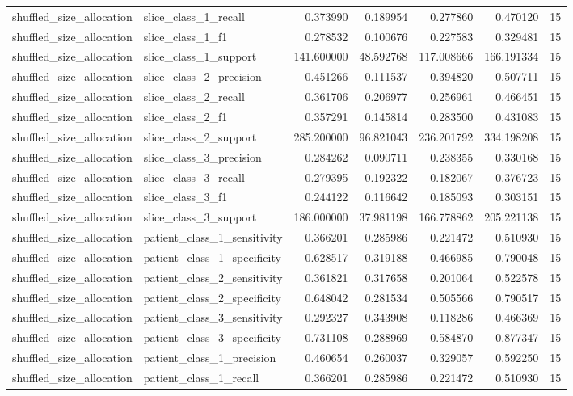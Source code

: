 \begin{tabular}{llrrrrr}
shuffled_size_allocation & slice_class_1_recall & 0.373990 & 0.189954 & 0.277860 & 0.470120 & 15 \\
shuffled_size_allocation & slice_class_1_f1 & 0.278532 & 0.100676 & 0.227583 & 0.329481 & 15 \\
shuffled_size_allocation & slice_class_1_support & 141.600000 & 48.592768 & 117.008666 & 166.191334 & 15 \\
shuffled_size_allocation & slice_class_2_precision & 0.451266 & 0.111537 & 0.394820 & 0.507711 & 15 \\
shuffled_size_allocation & slice_class_2_recall & 0.361706 & 0.206977 & 0.256961 & 0.466451 & 15 \\
shuffled_size_allocation & slice_class_2_f1 & 0.357291 & 0.145814 & 0.283500 & 0.431083 & 15 \\
shuffled_size_allocation & slice_class_2_support & 285.200000 & 96.821043 & 236.201792 & 334.198208 & 15 \\
shuffled_size_allocation & slice_class_3_precision & 0.284262 & 0.090711 & 0.238355 & 0.330168 & 15 \\
shuffled_size_allocation & slice_class_3_recall & 0.279395 & 0.192322 & 0.182067 & 0.376723 & 15 \\
shuffled_size_allocation & slice_class_3_f1 & 0.244122 & 0.116642 & 0.185093 & 0.303151 & 15 \\
shuffled_size_allocation & slice_class_3_support & 186.000000 & 37.981198 & 166.778862 & 205.221138 & 15 \\
shuffled_size_allocation & patient_class_1_sensitivity & 0.366201 & 0.285986 & 0.221472 & 0.510930 & 15 \\
shuffled_size_allocation & patient_class_1_specificity & 0.628517 & 0.319188 & 0.466985 & 0.790048 & 15 \\
shuffled_size_allocation & patient_class_2_sensitivity & 0.361821 & 0.317658 & 0.201064 & 0.522578 & 15 \\
shuffled_size_allocation & patient_class_2_specificity & 0.648042 & 0.281534 & 0.505566 & 0.790517 & 15 \\
shuffled_size_allocation & patient_class_3_sensitivity & 0.292327 & 0.343908 & 0.118286 & 0.466369 & 15 \\
shuffled_size_allocation & patient_class_3_specificity & 0.731108 & 0.288969 & 0.584870 & 0.877347 & 15 \\
shuffled_size_allocation & patient_class_1_precision & 0.460654 & 0.260037 & 0.329057 & 0.592250 & 15 \\
shuffled_size_allocation & patient_class_1_recall & 0.366201 & 0.285986 & 0.221472 & 0.510930 & 15 \\

\end{tabular}
